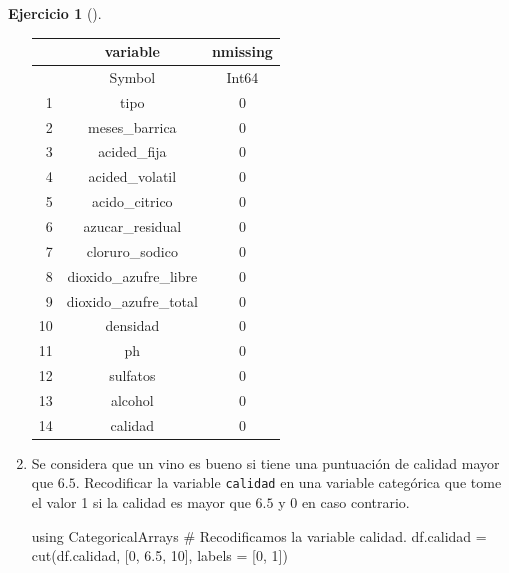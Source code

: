 \documentclass[
  a4paper,
]{scrreport}
\newenvironment{Shaded}{\begin{snugshade}}{\end{snugshade}}
\newcommand{\BuiltInTok}[1]{\textcolor[rgb]{0.00,0.23,0.31}{#1}}
\newcommand{\CommentTok}[1]{\textcolor[rgb]{0.37,0.37,0.37}{#1}}
\newcommand{\FloatTok}[1]{\textcolor[rgb]{0.68,0.00,0.00}{#1}}
\newcommand{\FunctionTok}[1]{\textcolor[rgb]{0.28,0.35,0.67}{#1}}
\newcommand{\ImportTok}[1]{\textcolor[rgb]{0.00,0.46,0.62}{#1}}
\newcommand{\NormalTok}[1]{\textcolor[rgb]{0.00,0.23,0.31}{#1}}
\newcommand{\OperatorTok}[1]{\textcolor[rgb]{0.37,0.37,0.37}{#1}}
\theoremstyle{definition}
\newtheorem{exercise}{Ejercicio}[chapter]
\theoremstyle{remark}
\begin{document}
\begin{exercise}[]
\begin{enumerate}
\begin{tcolorbox}
  \begin{tabular}{r|cc}
      & variable & nmissing\\
      \hline
      & Symbol & Int64\\
      \hline
      1 & tipo & 0 \\
      2 & meses\_barrica & 0 \\
      3 & acided\_fija & 0 \\
      4 & acided\_volatil & 0 \\
      5 & acido\_citrico & 0 \\
      6 & azucar\_residual & 0 \\
      7 & cloruro\_sodico & 0 \\
      8 & dioxido\_azufre\_libre & 0 \\
      9 & dioxido\_azufre\_total & 0 \\
      10 & densidad & 0 \\
      11 & ph & 0 \\
      12 & sulfatos & 0 \\
      13 & alcohol & 0 \\
      14 & calidad & 0 \\
  \end{tabular}

  \end{tcolorbox}
\item
  Se considera que un vino es bueno si tiene una puntuación de calidad
  mayor que \(6.5\). Recodificar la variable \texttt{calidad} en una
  variable categórica que tome el valor 1 si la calidad es mayor que
  \(6.5\) y 0 en caso contrario.

  \begin{tcolorbox}[enhanced jigsaw, toptitle=1mm, colframe=quarto-callout-tip-color-frame, titlerule=0mm, left=2mm, arc=.35mm, colbacktitle=quarto-callout-tip-color!10!white, opacityback=0, bottomtitle=1mm, toprule=.15mm, coltitle=black, breakable, colback=white, rightrule=.15mm, opacitybacktitle=0.6, leftrule=.75mm, bottomrule=.15mm, title=\textcolor{quarto-callout-tip-color}{\faLightbulb}\hspace{0.5em}{Solución}]

\begin{Shaded}
\begin{Highlighting}[]
\ImportTok{using} \BuiltInTok{CategoricalArrays}
\CommentTok{\# Recodificamos la variable calidad.}
\NormalTok{df.calidad }\OperatorTok{=} \FunctionTok{cut}\NormalTok{(df.calidad, [}\FloatTok{0}\NormalTok{, }\FloatTok{6.5}\NormalTok{, }\FloatTok{10}\NormalTok{], labels }\OperatorTok{=}\NormalTok{ [}\FloatTok{0}\NormalTok{, }\FloatTok{1}\NormalTok{])}
\end{Highlighting}
\end{Shaded}


\end{tcolorbox}
\end{enumerate}
\end{exercise}
\end{document}

